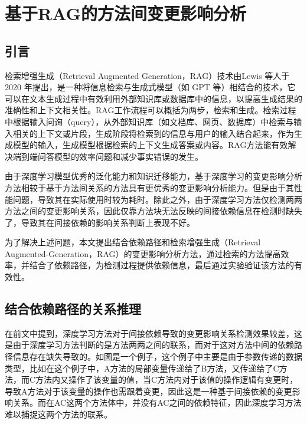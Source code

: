 \chapter{基于RAG的方法间变更影响分析}

\section{引言}

检索增强生成（Retrieval Augmented Generation，RAG）技术由Lewis 等人\cite{2020Retrieval}于 2020 年提出，是一种将信息检索与生成式模型（如 GPT 等）相结合的技术，它可以在文本生成过程中有效利用外部知识库或数据库中的信息，以提高生成结果的准确性和上下文相关性。RAG工作流程可以概括为两步，检索和生成。检索过程中根据输入问询（query），从外部知识库（如文档库、网页、数据库）中检索与输入相关的上下文或片段，生成阶段将检索到的信息与用户的输入结合起来，作为生成模型的输入，生成模型根据检索的上下文生成答案或内容。RAG方法能有效解决端到端问答模型的效率问题和减少事实错误的发生。

由于深度学习模型优秀的泛化能力和知识迁移能力，基于深度学习的变更影响分析方法相较于基于方法间关系的方法具有更优秀的变更影响分析能力。但是由于其性能问题，导致其在实际使用时较为耗时。除此之外，由于深度学习方法仅检测两两方法之间的变更影响关系，因此仅靠方法块无法反映的间接依赖信息在检测时缺失了，导致其在间接依赖的影响关系判断上表现不好。

为了解决上述问题，本文提出结合依赖路径和检索增强生成（Retrieval Augmented-Generation，RAG）的变更影响分析方法，通过检索的方法提高效率，并结合了依赖路径，为检测过程提供依赖信息，最后通过实验验证该方法的有效性。



\section{结合依赖路径的关系推理}

在前文中提到，深度学习方法对于间接依赖导致的变更影响关系检测效果较差，这是由于深度学习方法判断的是方法两两之间的联系，而对于这对方法中间的依赖路径信息存在缺失导致的。如图是一个例子，这个例子中主要是由于参数传递的数据类型，比如在这个例子中，A方法的局部变量传递给了B方法，又传递给了C方法，而C方法内又操作了该变量的值，当C方法内对于该值的操作逻辑有变更时，导致A方法对于该变量的操作也需跟着变更，因此这是一种基于间接依赖的变更影响关系。而在AC这两个方法体中，并没有AC之间的依赖特征，因此深度学习方法难以捕捉这两个方法的联系。


